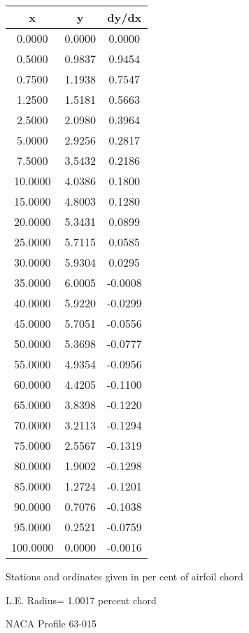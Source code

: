 \documentclass[11pt]{book}
\begin{document}
 \vspace{8mm}
 \begin{tabular}{|c|c|c|} \hline 
  x  &  y  &  dy/dx \\
 \hline
0.0000 & 0.0000 & 0.0000 \\
0.5000 & 0.9837 & 0.9454 \\
0.7500 & 1.1938 & 0.7547 \\
1.2500 & 1.5181 & 0.5663 \\
2.5000 & 2.0980 & 0.3964 \\
5.0000 & 2.9256 & 0.2817 \\
7.5000 & 3.5432 & 0.2186 \\
10.0000 & 4.0386 & 0.1800 \\
15.0000 & 4.8003 & 0.1280 \\
20.0000 & 5.3431 & 0.0899 \\
25.0000 & 5.7115 & 0.0585 \\
30.0000 & 5.9304 & 0.0295 \\
35.0000 & 6.0005 & -0.0008 \\
40.0000 & 5.9220 & -0.0299 \\
45.0000 & 5.7051 & -0.0556 \\
50.0000 & 5.3698 & -0.0777 \\
55.0000 & 4.9354 & -0.0956 \\
60.0000 & 4.4205 & -0.1100 \\
65.0000 & 3.8398 & -0.1220 \\
70.0000 & 3.2113 & -0.1294 \\
75.0000 & 2.5567 & -0.1319 \\
80.0000 & 1.9002 & -0.1298 \\
85.0000 & 1.2724 & -0.1201 \\
90.0000 & 0.7076 & -0.1038 \\
95.0000 & 0.2521 & -0.0759 \\
100.0000 & 0.0000 & -0.0016 \\
 \hline
 \end{tabular}
 \vspace{8mm}


Stations and ordinates given in per cent of airfoil chord 


L.E. Radius=  1.0017 percent chord
 \newpage
  \label{p63-015}
 \begin{Large}
 NACA Profile 63-015
 \end{Large}
  
\end{document}
